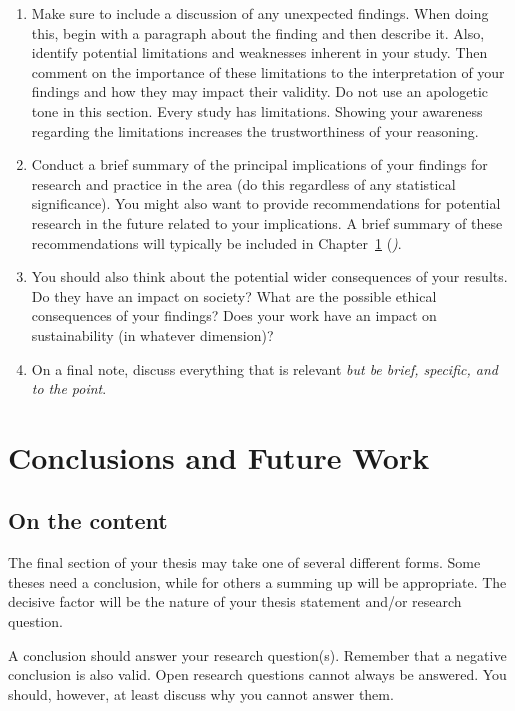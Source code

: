\documentclass[a4paper,twoside]{bth}
\begin{document}
\begin{enumerate}
    \item Make sure to include a discussion of any unexpected findings. When doing this, begin with a paragraph about the finding and then describe it. Also, identify potential limitations and weaknesses inherent in your study. Then comment on the importance of these limitations to the interpretation of your findings and how they may impact their validity. Do not use an apologetic tone in this section. Every study has limitations. Showing your awareness regarding the limitations increases the trustworthiness of your reasoning.
    \item Conduct a brief summary of the principal implications of your findings for research and practice in the area (do this regardless of any statistical significance). You might also want to provide recommendations for potential research in the future related to your implications. A brief summary of these recommendations will typically be included in Chapter~\ref{chp:conclusions} (\emph{)}.
    \item You should also think about the potential wider consequences of your results. Do they have an impact on society? What are the possible ethical consequences of your findings? Does your work have an impact on sustainability (in whatever dimension)?
    \item On a final note, discuss everything that is relevant \emph{but be brief, specific, and to the point}.
\end{enumerate}


\chapter{Conclusions and Future Work}
\label{chp:conclusions}
\section{On the content}
The final section of your thesis may take one of several different forms. Some theses need a conclusion, while for others a summing up will be appropriate. The decisive factor will be the nature of your thesis statement and/or research question.

A conclusion should answer your research question(s). Remember that a negative conclusion is also valid. Open research questions cannot always be answered. You should, however, at least discuss why you cannot answer them.
\end{document}
